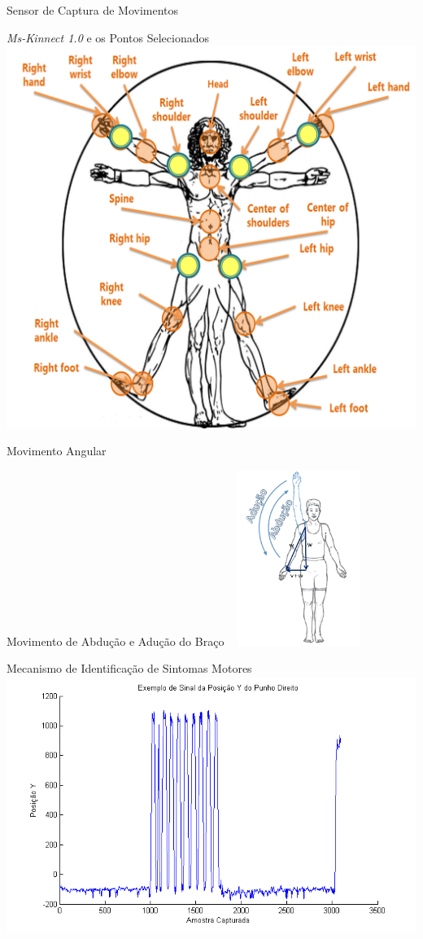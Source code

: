 \documentclass{beamer}
\begin{document}
\begin{frame}{Sensor de Captura de Movimentos}
  \begin{block}{\textit{Ms-Kinnect 1.0} e os Pontos Selecionados}
      \center \includegraphics[height=2.5 in]{img/articulacoes-sel.png}
  \end{block}
\end{frame}

\begin{frame}{Movimento Angular}
  \begin{block}{Movimento de Abdução e Adução do Braço ~\cite{mcginnis2013biomechanics}}
      \center \includegraphics[width=4cm]{img/abducao-angulo.png}
  \end{block}
\end{frame}

\begin{frame}{Mecanismo de Identificação de Sintomas Motores}
      \center \includegraphics[height=3 in]{img/exsinalposicaoypunhodireito.png}
\end{frame}
\end{document}
